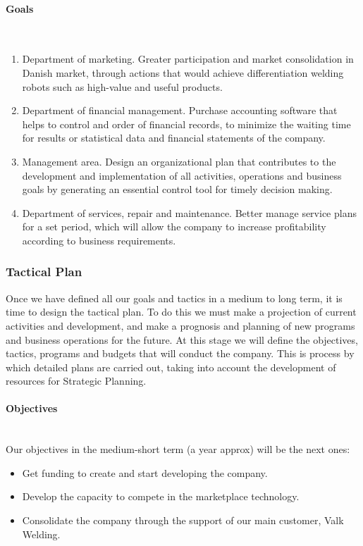 \paragraph*{Goals}~\\
\begin{enumerate}
\item Department of marketing. 
      Greater participation and market consolidation in Danish market, through actions that would achieve differentiation welding robots such as high-value and useful products.
\item Department of financial management. 
      Purchase accounting software that helps to control and order of financial records, to minimize the waiting time for results or statistical data and financial statements of the company.
\item Management area. Design an organizational plan that contributes to the development and implementation of all activities, operations and business goals by generating an essential 	      control tool for timely decision making.
\item Department of services, repair and maintenance. Better manage service plans for a set period, which will allow the company to increase profitability according to business
      requirements.
\end{enumerate}


\subsubsection{Tactical Plan}
Once we have defined all our goals and tactics in a medium to long term, it is time to design the tactical plan. To do this we must make a projection of current activities and development, and make a prognosis and planning of new programs and business operations for the future. At this stage we will define the objectives, tactics, programs and budgets that will conduct the company. This is process by which detailed plans are carried out, taking into account the development of resources for Strategic Planning.

\paragraph*{Objectives}~\\
Our objectives in the medium-short term (a year approx) will be the next ones:
\begin{itemize}[-]
\item Get funding to create and start developing the company.
\item Develop the capacity to compete in the marketplace technology.
\item Consolidate the company through the support of our main customer, Valk Welding.
\end{itemize}

